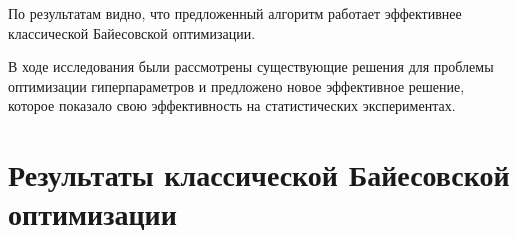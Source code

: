 \documentclass[times,specification,annotation]{itmo-student-thesis}
\begin{document}
	\chapterconclusion
	По результатам видно, что предложенный алгоритм работает эффективнее классической Байесовской оптимизации.
	
	
	\startconclusionpage
	В ходе исследования были рассмотрены существующие решения для проблемы оптимизации гиперпараметров и предложено новое эффективное решение, которое показало свою эффективность на статистических экспериментах.
	
	\printmainbibliography
	
	
	\appendix
	\chapter{Результаты классической Байесовской оптимизации}\label{sec:app:1}
\end{document}
